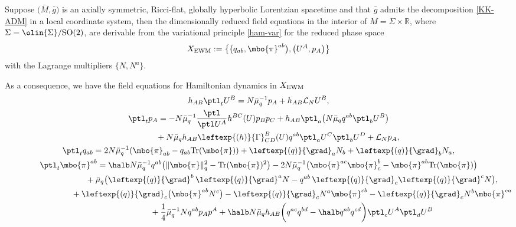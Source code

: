 \begin{Theorem}
Suppose $\bigl(\bar{M}, \bar{g}\bigr)$ is an axially symmetric, Ricci-flat, globally hyperbolic Lorentzian spacetime and that $\bar{g}$ admits the decomposition \eqref{KK-ADM} in a local coordinate system, then the dimensionally reduced field equations in the interior of $M = \Sigma \times \mathbb{R}$, where $\Sigma = \olin{\Sigma}/{\rm SO}(2)$, are derivable from the variational principle \eqref{ham-var} for the reduced phase space
\begin{align*}
X_{{\rm EWM}} := \bigl\{ \bigl(q_{ab}, \mbo{\pi}^{ab}\bigr), \bigl(U^A, p_A\bigr) \bigr\}
\end{align*}
with the Lagrange multipliers $\{ N, N^a \}$.
\end{Theorem}

As a consequence, we have the field equations for Hamiltonian dynamics in $X_{{\rm EWM}}$
\begin{subequations}
\begin{gather}
h_{AB} \ptl_t U^B = N \bar{\mu}^{-1}_q p_A + h_{AB} \mathcal{L}_N U^B, \\
\ptl_t p_A= - N \bar{\mu}^{-1}_q\frac{\ptl}{\ptl U^A}h^{BC} (U) p_B p_C + h_{AB} \ptl_a\bigl(N \bar{\mu}_q q^{ab} \ptl_b U^B\bigr) \notag\\
 \hphantom{\ptl_t p_A=}{}
 + N \bar{\mu}_q h_{AB} \leftexp{(h)}{\Gamma}^B_{CD}(U)q^{ab}\ptl_a U^C \ptl_b U^D + \mathcal{L}_N p_A,\\
\ptl_t q_{ab} = 2 N \bar{\mu}^{-1}_q (\mbo{\pi}_{ab} - q_{ab} {\rm Tr} (\mbo{\pi})) + \leftexp{(q)}{\grad}_a N_b + \leftexp{(q)}{\grad}_b N_a, \label{qdot}\\
\ptl_t \mbo{\pi}^{ab}= \halb N \bar{\mu}^{-1}_q q^{ab} \bigl(\Vert \mbo{\pi} \Vert^2_q - {\rm Tr}(\mbo{\pi})^2\bigr)- 2N \bar{\mu}^{-1}_q \bigl( \mbo{\pi}^{ac} \mbo{\pi}^{b}_c - \mbo{\pi}^{ab} {\rm Tr}(\mbo{\pi}) \bigr) \notag\\
\hphantom{\ptl_t \mbo{\pi}^{ab}=}{}
 +\bar{\mu}_q \bigl(\leftexp{(q)}{\grad}^b \,\leftexp{(q)}{\grad}^a N -q^{ab}\, \leftexp{(q)}{\grad}_c \leftexp{(q)}{\grad}^c N\bigr), \notag\\
\hphantom{\ptl_t \mbo{\pi}^{ab}=}{}
 + \leftexp{(q)}{\grad}_c\bigl(\mbo{\pi}^{ab} N^c\bigr) - \leftexp{(q)}{\grad}_c N^a \mbo{\pi}^{cb} - \leftexp{(q)}{\grad}_c N^b \mbo{\pi}^{ca}\notag\\
\hphantom{\ptl_t \mbo{\pi}^{ab}=}{}
 + \frac{1}{4}\bar{\mu}_q^{-1}N q^{ab} p_A p^A + \halb N \bar{\mu}_q h_{AB} \biggl(q^{ac}q^{bd} - \halb q^{ab} q^{cd}\biggr)\ptl_c U^A \ptl_d U^B
\end{gather}
\end{subequations}
